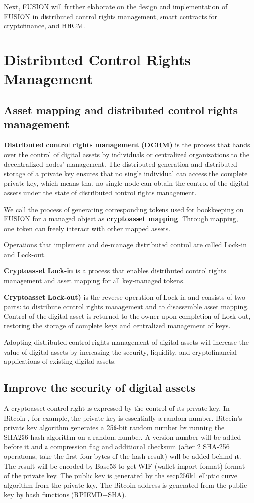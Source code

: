 \documentclass[a4paper,12pt]{article}
\begin{document}
Next, FUSION will further elaborate on the design and implementation of FUSION in distributed control rights management, smart contracts for cryptofinance, and HHCM.

\section{Distributed Control Rights Management}
\subsection{Asset mapping and distributed control rights management}
{\bfseries{Distributed control rights management (DCRM)}} is the process that hands over the control of digital assets by individuals or centralized organizations to the decentralized nodes' management. The distributed generation and distributed storage of a private key ensures that no single individual can access the complete private key, which means that no single node can obtain the control of the digital assets under the state of distributed control rights management.

We call the process of generating corresponding tokens used for bookkeeping on FUSION for a managed object as {\bfseries {cryptoasset mapping}}. Through mapping, one token can freely interact with other mapped assets.

Operations that implement and de-manage distributed control are called Lock-in and Lock-out.

\textbf{Cryptoasset Lock-in} is a process that enables distributed control rights management and asset mapping for all key-managed tokens.

\textbf{Cryptoasset Lock-out)} is the reverse operation of Lock-in and consists of two parts: to distribute control rights management and to disassemble asset mapping. Control of the digital asset is returned to the owner upon completion of Lock-out, restoring the storage of complete keys and centralized management of keys.

Adopting distributed control rights management of digital assets will increase the value of digital assets by increasing the security, liquidity, and cryptofinancial applications of existing digital assets.

\subsection{Improve the security of digital assets}
A cryptoasset control right is expressed by the control of its private key. In Bitcoin \citep{Satoshi2008}, for example, the private key is essentially a random number. Bitcoin's private key algorithm generates a 256-bit random number by running the SHA256 hash algorithm on a random number. A version number will be added before it and a compression flag and additional checksum (after 2 SHA-256 operations, take the first four bytes of the hash result) will be added behind it. The result will be encoded by Base58 to get WIF (wallet import format) format of the private key. The public key is generated by the secp256k1 elliptic curve algorithm from the private key. The Bitcoin address is generated from the public key by hash functions (RPIEMD+SHA).
\end{document}
